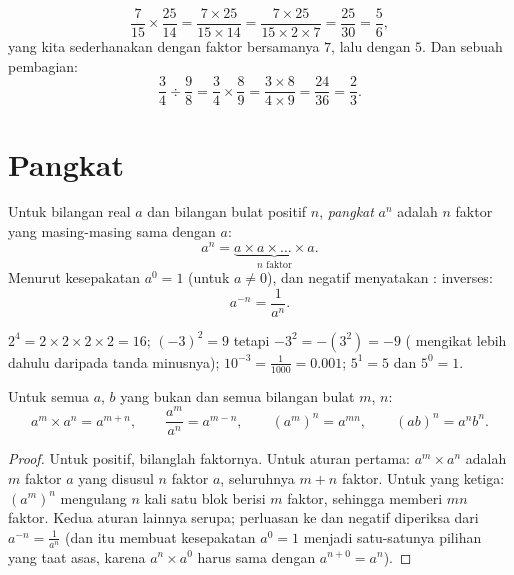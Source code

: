 \begin{example}\label{ex:g9:fractions:mult}
\[
\frac{7}{15} \times \frac{25}{14}
= \frac{7 \times 25}{15 \times 14}
= \frac{7 \times 25}{15 \times 2 \times 7}
= \frac{25}{30} = \frac56,
\]
yang kita sederhanakan dengan faktor bersamanya $7$, lalu dengan $5$.
Dan sebuah pembagian:
\[
\frac{3}{4} \div \frac{9}{8}
= \frac34 \times \frac89
= \frac{3 \times 8}{4 \times 9}
= \frac{24}{36} = \frac23 .
\]
\end{example}

\section{Pangkat}

\begin{definition}[Pangkat]\label{def:g9:fractions:power}
Untuk bilangan real $a$ dan bilangan bulat positif $n$,
\emph{pangkat} $a^n$ adalah  $n$ faktor yang
masing-masing sama dengan $a$:
\[
a^n = \underbrace{a \times a \times \dots \times a}_{n \text{ faktor}} .
\]
Menurut kesepakatan $a^0 = 1$ (untuk $a \neq 0$), dan  negatif
menyatakan :
inverses:
\[
a^{-n} = \frac{1}{a^n}.
\]
\end{definition}

\begin{example}
$2^4 = 2 \times 2 \times 2 \times 2 = 16$; \quad
$(-3)^2 = 9$ tetapi $-3^2 = -(3^2) = -9$ ( mengikat lebih
dahulu daripada tanda minusnya); \quad
$10^{-3} = \frac{1}{1000} = 0.001$; \quad
$5^1 = 5$ dan $5^0 = 1$.
\end{example}

\begin{theorem}\label{thm:g9:fractions:rules}
Untuk semua $a$, $b$ yang bukan  dan semua bilangan bulat $m$, $n$:
\[
a^m \times a^n = a^{m+n},
\qquad
\frac{a^m}{a^n} = a^{m-n},
\qquad
\left(a^m\right)^n = a^{mn},
\qquad
(ab)^n = a^n b^n .
\]
\end{theorem}

\begin{proof}
Untuk  positif, bilanglah faktornya. Untuk aturan pertama:
$a^m \times a^n$ adalah $m$ faktor $a$ yang disusul $n$ faktor $a$,
seluruhnya $m + n$ faktor. Untuk yang ketiga:
$\left(a^m\right)^n$ mengulang $n$ kali satu blok berisi $m$ faktor,
sehingga memberi $mn$ faktor. Kedua aturan lainnya serupa; perluasan
ke   dan negatif diperiksa dari $a^{-n} = \frac{1}{a^n}$
(dan itu membuat kesepakatan $a^0 = 1$ menjadi satu-satunya pilihan
yang taat asas, karena $a^n \times a^0$ harus sama dengan
$a^{n+0} = a^n$).
\end{proof}

